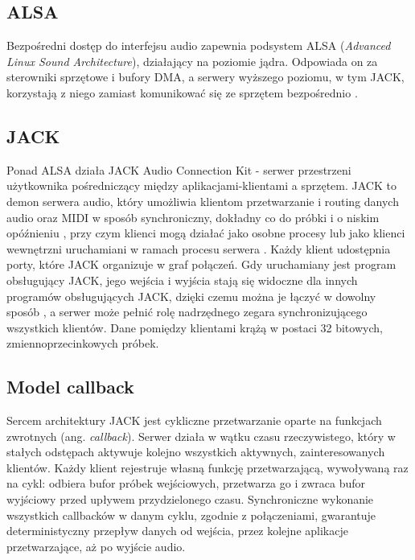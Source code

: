 \documentclass[12pt,a4paper]{report}
\begin{document}
\subsection{ALSA}

Bezpośredni dostęp do interfejsu audio zapewnia podsystem ALSA
(\textit{Advanced Linux Sound Architecture}), działający na poziomie
jądra. Odpowiada on za sterowniki sprzętowe i bufory DMA, a serwery
wyższego poziomu, w tym JACK, korzystają z niego zamiast komunikować
się ze sprzętem bezpośrednio \cite{gentoo_jack}.

\subsection{JACK}

Ponad ALSA działa JACK Audio Connection Kit - serwer przestrzeni
użytkownika pośredniczący między aplikacjami-klientami a sprzętem.
JACK to demon serwera audio, który umożliwia klientom przetwarzanie i
routing danych audio oraz MIDI w sposób synchroniczny, dokładny co do
próbki i o niskim opóźnieniu \cite{jackd_manpage}, przy czym klienci
mogą działać jako osobne procesy lub jako klienci wewnętrzni
uruchamiani w ramach procesu serwera \cite{jackd_manpage}. Każdy
klient udostępnia porty, które JACK organizuje w graf połączeń. Gdy
uruchamiany jest program obsługujący JACK, jego wejścia i wyjścia
stają się widoczne dla innych programów obsługujących JACK, dzięki
czemu można je łączyć w dowolny sposób
\cite{libremusicproduction_jack}, a serwer może pełnić rolę
nadrzędnego zegara synchronizującego wszystkich klientów. Dane
pomiędzy klientami krążą w postaci 32 bitowych, zmiennoprzecinkowych próbek.

\subsection{Model callback}
\label{sec:jack_callback}

Sercem architektury JACK jest cykliczne przetwarzanie oparte na
funkcjach zwrotnych (ang. \textit{callback}). Serwer działa w wątku
czasu rzeczywistego, który w stałych odstępach aktywuje
kolejno wszystkich aktywnych, zainteresowanych klientów. Każdy klient
rejestruje własną
funkcję przetwarzającą, wywoływaną raz na cykl: odbiera bufor próbek
wejściowych, przetwarza go i zwraca bufor wyjściowy przed upływem
przydzielonego czasu. Synchroniczne wykonanie wszystkich callbacków w
danym cyklu, zgodnie z połączeniami, gwarantuje deterministyczny
przepływ danych od wejścia, przez kolejne aplikacje przetwarzające,
aż po wyjście audio.
\end{document}
